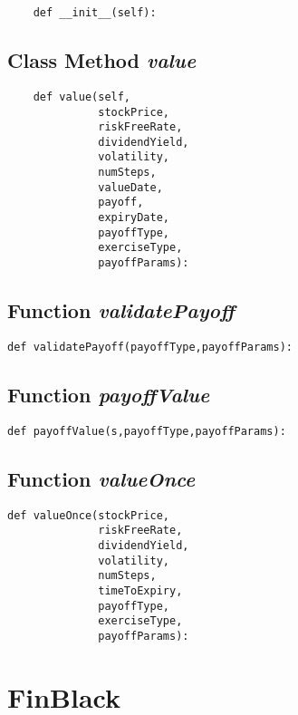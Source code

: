 \documentclass[twoside,11pt]{book}
\begin{document}
\begin{lstlisting}
    def __init__(self):
\end{lstlisting}

\subsection{Class Method {\it value}}


\begin{lstlisting}
    def value(self,
              stockPrice,
              riskFreeRate,
              dividendYield,
              volatility,
              numSteps,
              valueDate,
              payoff,
              expiryDate,
              payoffType,
              exerciseType,
              payoffParams):
\end{lstlisting}

\subsection{Function {\it validatePayoff}}


\begin{lstlisting}
def validatePayoff(payoffType,payoffParams):
\end{lstlisting}

\subsection{Function {\it payoffValue}}


\begin{lstlisting}
def payoffValue(s,payoffType,payoffParams):
\end{lstlisting}

\subsection{Function {\it valueOnce}}


\begin{lstlisting}
def valueOnce(stockPrice,
              riskFreeRate,
              dividendYield,
              volatility,
              numSteps,
              timeToExpiry,
              payoffType,
              exerciseType,
              payoffParams):
\end{lstlisting}

\newpage
\section{FinBlack}
\end{document}
